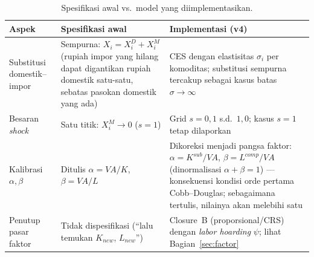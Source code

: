 \documentclass[11pt,a4paper]{article}
\newcommand{\en}[1]{\textit{#1}}   %
\begin{document}
\begin{table}[ht]
\centering\small
\caption{Spesifikasi awal vs.\ model yang diimplementasikan.}
\label{tab:vsboss}
\begin{tabular}{@{}p{3.3cm}p{5.2cm}p{5.6cm}@{}}
\toprule
\textbf{Aspek} & \textbf{Spesifikasi awal} & \textbf{Implementasi (v4)} \\
\midrule
Substitusi domestik--impor &
Sempurna: $X_i = X_i^D + X_i^M$ (rupiah impor yang hilang dapat digantikan
rupiah domestik satu-satu, sebatas pasokan domestik yang ada) &
CES dengan elastisitas $\sigma_i$ per komoditas; substitusi sempurna
tercakup sebagai kasus batas $\sigma \to \infty$ \\
\addlinespace[3pt]
Besaran \en{shock} &
Satu titik: $X_i^M \to 0$ ($s = 1$) &
Grid $s = 0{,}1$ s.d.\ $1{,}0$; kasus $s = 1$ tetap dilaporkan \\
\addlinespace[3pt]
Kalibrasi $\alpha, \beta$ &
Ditulis $\alpha = VA/K$, $\beta = VA/L$ &
Dikoreksi menjadi pangsa faktor: $\alpha = K^{sub}/VA$,
$\beta = L^{comp}/VA$ (dinormalisasi $\alpha + \beta = 1$) ---
konsekuensi kondisi orde pertama Cobb--Douglas; sebagaimana tertulis,
nilainya akan melebihi satu \\
\addlinespace[3pt]
Penutup pasar faktor &
Tidak dispesifikasi (``lalu temukan $K_{new}$, $L_{new}$'') &
Closure~B (proporsional/CRS) dengan \en{labor hoarding} $\psi$;
lihat Bagian~\ref{sec:factor} \\
\bottomrule
\end{tabular}
\end{table}
\end{document}
